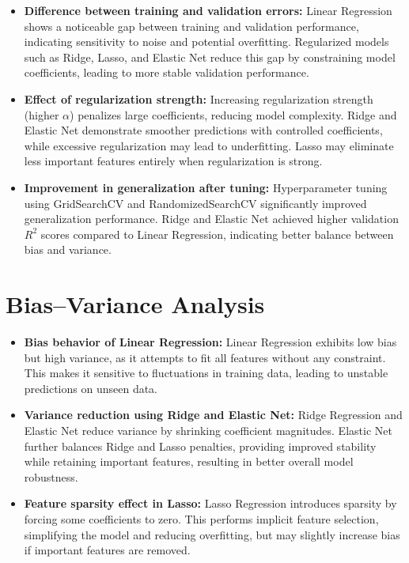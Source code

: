 \documentclass[11pt]{article}
\begin{document}
\begin{itemize}
    \item \textbf{Difference between training and validation errors:}  
    Linear Regression shows a noticeable gap between training and validation performance, indicating sensitivity to noise and potential overfitting. Regularized models such as Ridge, Lasso, and Elastic Net reduce this gap by constraining model coefficients, leading to more stable validation performance.

    \item \textbf{Effect of regularization strength:}  
    Increasing regularization strength (higher $\alpha$) penalizes large coefficients, reducing model complexity. Ridge and Elastic Net demonstrate smoother predictions with controlled coefficients, while excessive regularization may lead to underfitting. Lasso may eliminate less important features entirely when regularization is strong.

    \item \textbf{Improvement in generalization after tuning:}  
    Hyperparameter tuning using GridSearchCV and RandomizedSearchCV significantly improved generalization performance. Ridge and Elastic Net achieved higher validation $R^2$ scores compared to Linear Regression, indicating better balance between bias and variance.
\end{itemize}

\section{Bias--Variance Analysis}

\begin{itemize}
    \item \textbf{Bias behavior of Linear Regression:}  
    Linear Regression exhibits low bias but high variance, as it attempts to fit all features without any constraint. This makes it sensitive to fluctuations in training data, leading to unstable predictions on unseen data.

    \item \textbf{Variance reduction using Ridge and Elastic Net:}  
    Ridge Regression and Elastic Net reduce variance by shrinking coefficient magnitudes. Elastic Net further balances Ridge and Lasso penalties, providing improved stability while retaining important features, resulting in better overall model robustness.

    \item \textbf{Feature sparsity effect in Lasso:}  
    Lasso Regression introduces sparsity by forcing some coefficients to zero. This performs implicit feature selection, simplifying the model and reducing overfitting, but may slightly increase bias if important features are removed.
\end{itemize}
\end{document}
